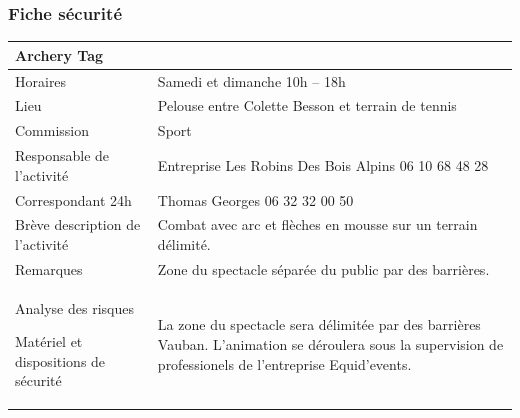 \documentclass[hidelinks, paper=a4, fontsize=13pt]{report}
\begin{document}
\subsubsection{Fiche sécurité}
\begin{center}
\begin{tabular}{ | p{6cm} | p{10cm} | }
\hline
	\multicolumn{2}{|l|}{Archery Tag}  \\ \hline
	Horaires & Samedi et dimanche 10h – 18h \\ \hline
	Lieu & Pelouse entre Colette Besson et terrain de tennis \\ \hline
	Commission & Sport \\ \hline
	Responsable de l'activité & Entreprise Les Robins Des Bois Alpins 06 10 68 48 28 \\ \hline
	Correspondant 24h & Thomas Georges 06 32 32 00 50  \\ \hline
	Brève description de l'activité & Combat avec arc et flèches en mousse sur un terrain délimité. \\ \hline
	Remarques & Zone du spectacle séparée du public par des barrières. \\ \hline
	Analyse des risques
	
Matériel et dispositions de sécurité & La zone du spectacle sera délimitée par des barrières Vauban. L'animation se déroulera sous la supervision de professionels de l'entreprise Equid'events. \\ \hline
\end{tabular}

\end{center}
\end{document}
